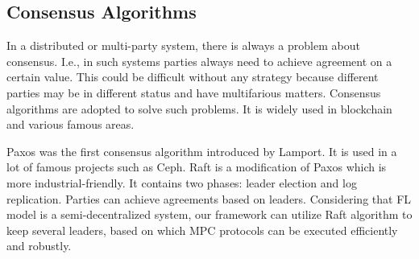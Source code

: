 \subsection{Consensus Algorithms}
In a distributed or multi-party system, there is always a problem about consensus. I.e., in such systems parties always need to achieve agreement on a certain value. This could be difficult without any strategy because different parties may be in different status and have multifarious matters. Consensus algorithms are adopted to solve such problems. It is widely used in blockchain and various famous areas.

Paxos was the first consensus algorithm introduced by Lamport\cite{Paxos}. It is used in a lot of famous projects such as Ceph\cite{Ceph}. Raft is a modification of Paxos which is more industrial-friendly\cite{Raft}. It contains two phases: leader election and log replication. Parties can achieve agreements based on leaders. Considering that FL model is a semi-decentralized system, our framework can utilize Raft algorithm to keep several leaders, based on which MPC protocols can be executed efficiently and robustly.
